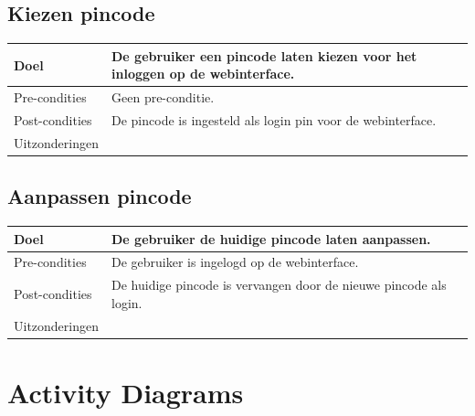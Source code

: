 \subsection{Kiezen pincode}
\begin{center}
  \begin{tabular}{ | p{4cm} | p{8.5cm} | }    \hline
    \hline
    Doel & De gebruiker een pincode laten kiezen voor het inloggen op de webinterface. \\ \hline
    Pre-condities & Geen pre-conditie. \\ \hline
    Post-condities & De pincode is ingesteld als login pin voor de webinterface. \\ \hline
    Uitzonderingen &  \\
    \hline
  \end{tabular}
\end{center}

\subsection{Aanpassen pincode}
\begin{center}
  \begin{tabular}{ | p{4cm} | p{8.5cm} | }    \hline
    Doel & De gebruiker de huidige pincode laten aanpassen. \\ \hline
    Pre-condities & De gebruiker is ingelogd op de webinterface. \\ \hline
    Post-condities & De huidige pincode is vervangen door de nieuwe pincode als login. \\ \hline
	Uitzonderingen &  \\
    \hline
  \end{tabular}
\end{center}

\section{Activity Diagrams}
